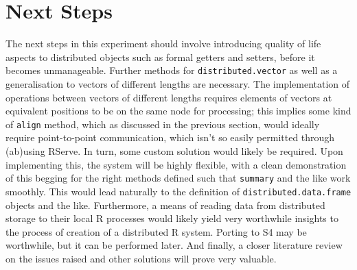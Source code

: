 \documentclass[a4paper,10pt]{article}
\begin{document}
\section{Next Steps}

The next steps in this experiment should involve introducing quality of life
aspects to distributed objects such as formal getters and setters, before it
becomes unmanageable.
Further methods for \texttt{distributed.vector} as well as a generalisation to vectors
of different lengths are necessary.
The implementation of operations between vectors of different lengths requires
elements of vectors at equivalent positions to be on the same node for
processing; this implies some kind of \texttt{align} method, which as discussed in the
previous section, would ideally require point-to-point communication, which
isn't so easily permitted through (ab)using RServe.
In turn, some custom solution would likely be required.
Upon implementing this, the system will be highly flexible, with a clean
demonstration of this begging for the right methods defined such that \texttt{summary}
and the like work smoothly.
This would lead naturally to the definition of \texttt{distributed.data.frame} objects
and the like.
Furthermore, a means of reading data from distributed storage to their local R
processes would likely yield very worthwhile insights to the process of
creation of a distributed R system.
Porting to S4 may be worthwhile, but it can be performed later.
And finally, a closer literature review on the issues raised and other
solutions will prove very valuable.
\end{document}
